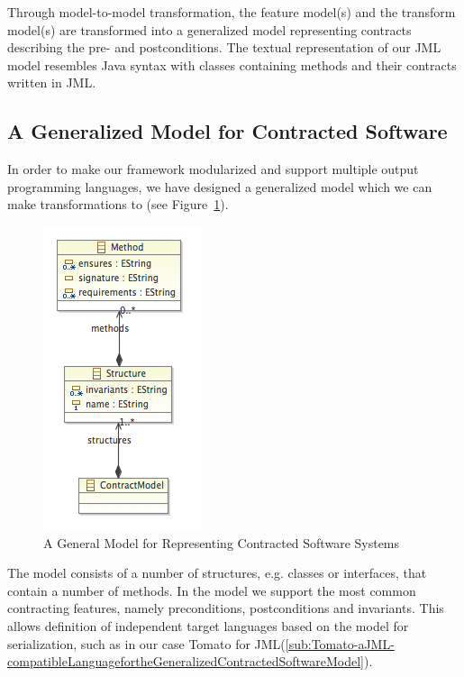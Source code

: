 Through model-to-model transformation, the feature model(s) and the transform model(s) are transformed into a generalized model representing contracts describing the pre- and postconditions. The textual representation of our JML model resembles Java syntax with classes containing methods and their contracts written in JML. 

\subsection{A Generalized Model for Contracted Software}
\label{sub:AGeneralizedModelforContractedSoftware}

In order to make our framework modularized and support multiple output programming languages, we have designed a generalized model which
we can make transformations to (see Figure~\ref{fig:generaloutputmodel}).

\begin{figure}
  \begin{center}
    \includegraphics[scale=0.35]{images/generalized_outputmodel.png}
  \end{center}
  \caption{A General Model for Representing Contracted Software Systems}
  \label{fig:generaloutputmodel}
\end{figure}

The model consists of a number of structures, e.g. classes or interfaces, that contain a number of methods.
In the model we support the most common contracting features, namely preconditions, postconditions and invariants.
This allows definition of independent target languages based on the model for serialization, such as in our case Tomato for JML(\ref{sub:Tomato-aJML-compatibleLanguagefortheGeneralizedContractedSoftwareModel}).

